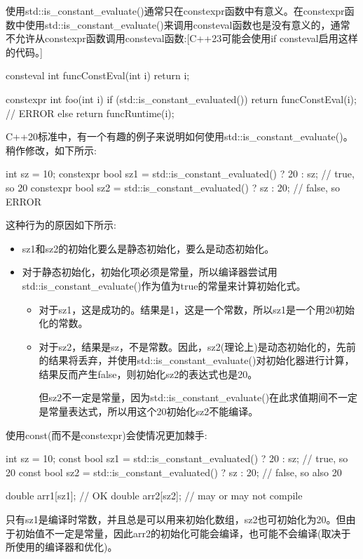 使用std::is\_constant\_evaluate()通常只在constexpr函数中有意义。在constexpr函数中使用std::is\_constant\_evaluate()来调用consteval函数也是没有意义的，通常不允许从constexpr函数调用consteval函数:[C++23可能会使用if consteval启用这样的代码。]

\begin{cpp}
consteval int funcConstEval(int i) {
	return i;
}

constexpr int foo(int i) {
	if (std::is_constant_evaluated()) {
		return funcConstEval(i); // ERROR
	}
	else {
		return funcRuntime(i);
	}
}
\end{cpp}


C++20标准中，有一个有趣的例子来说明如何使用std::is\_constant\_evaluate()。稍作修改，如下所示:

\begin{cpp}
int sz = 10;
constexpr bool sz1 = std::is_constant_evaluated() ? 20 : sz; // true, so 20
constexpr bool sz2 = std::is_constant_evaluated() ? sz : 20; // false, so ERROR
\end{cpp}

这种行为的原因如下所示:

\begin{itemize}
\item
sz1和sz2的初始化要么是静态初始化，要么是动态初始化。

\item
对于静态初始化，初始化项必须是常量，所以编译器尝试用std::is\_constant\_evaluate()作为值为true的常量来计算初始化式。

\begin{itemize}
\item
对于sz1，这是成功的。结果是1，这是一个常数，所以sz1是一个用20初始化的常数。

\item
对于sz2，结果是sz，不是常数。因此，sz2(理论上)是动态初始化的，先前的结果将丢弃，并使用std::is\_constant\_evaluate()对初始化器进行计算，结果反而产生false，则初始化sz2的表达式也是20。

但sz2不一定是常量，因为std::is\_constant\_evaluate()在此求值期间不一定是常量表达式，所以用这个20初始化sz2不能编译。
\end{itemize}
\end{itemize}

使用const(而不是constexpr)会使情况更加棘手:

\begin{cpp}
int sz = 10;
const bool sz1 = std::is_constant_evaluated() ? 20 : sz; // true, so 20
const bool sz2 = std::is_constant_evaluated() ? sz : 20; // false, so also 20

double arr1[sz1]; // OK
double arr2[sz2]; // may or may not compile
\end{cpp}

只有sz1是编译时常数，并且总是可以用来初始化数组，sz2也可初始化为20。但由于初始值不一定是常量，因此arr2的初始化可能会编译，也可能不会编译(取决于所使用的编译器和优化)。


















